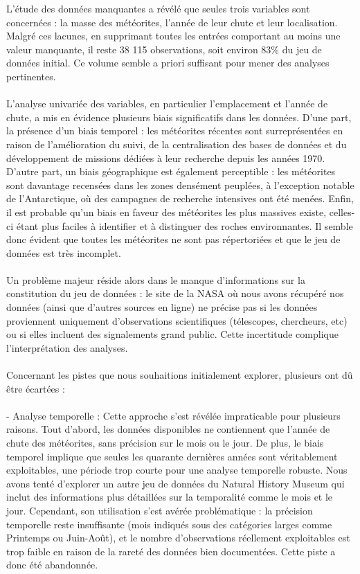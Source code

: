\documentclass[12pt]{article}
\begin{document}
L’étude des données manquantes a révélé que seules trois variables sont concernées : la masse des météorites, l’année de leur chute et leur localisation. Malgré ces lacunes, en supprimant toutes les entrées comportant au moins une valeur manquante, il reste 38 115 observations, soit environ 83\% du jeu de données initial. Ce volume semble a priori suffisant pour mener des analyses pertinentes.\\
\\
L’analyse univariée des variables, en particulier l’emplacement et l’année de chute, a mis en évidence plusieurs biais significatifs dans les données. D’une part, la présence d'un biais temporel : les météorites récentes sont surreprésentées en raison de l’amélioration du suivi, de la centralisation des bases de données et du développement de missions dédiées à leur recherche depuis les années 1970. D’autre part, un biais géographique est également perceptible : les météorites sont davantage recensées dans les zones densément peuplées, à l’exception notable de l’Antarctique, où des campagnes de recherche intensives ont été menées. Enfin, il est probable qu’un biais en faveur des météorites les plus massives existe, celles-ci étant plus faciles à identifier et à distinguer des roches environnantes. Il semble donc évident que toutes les météorites ne sont pas répertoriées et que le jeu de données est très incomplet.\\
\\
Un problème majeur réside alors dans le manque d’informations sur la constitution du jeu de données : le site de la NASA où nous avons récupéré nos données (ainsi que d’autres sources en ligne) ne précise pas si les données proviennent uniquement d’observations scientifiques (télescopes, chercheurs, etc) ou si elles incluent des signalements grand public. Cette incertitude complique l’interprétation des analyses.\\
\\
Concernant les pistes que nous souhaitions initialement explorer, plusieurs ont dû être écartées :\\
\\
 - Analyse temporelle : Cette approche s’est révélée impraticable pour plusieurs raisons. Tout d’abord, les données disponibles ne contiennent que l’année de chute des météorites, sans précision sur le mois ou le jour. De plus, le biais temporel implique que seules les quarante dernières années sont véritablement exploitables, une période trop courte pour une analyse temporelle robuste. Nous avons tenté d’explorer un autre jeu de données du Natural History Museum \cite{MetCat} qui inclut des informations plus détaillées sur la temporalité comme le mois et le jour. Cependant, son utilisation s’est avérée problématique : la précision temporelle reste insuffisante (mois indiqués sous des catégories larges comme Printemps ou Juin-Août), et le nombre d’observations réellement exploitables est trop faible en raison de la rareté des données bien documentées. Cette piste a donc été abandonnée.\\
\end{document}
